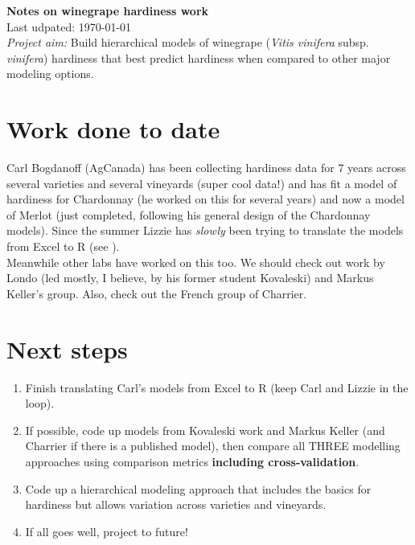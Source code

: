 \documentclass[11pt,letter]{article}
\begin{document}

\renewcommand{\refname}{\CHead{}}

{\bf Notes on winegrape hardiness work}\\

Last udpated: \today\\

\emph{Project aim:} Build hierarchical models of winegrape (\emph{Vitis vinifera} subsp. \emph{vinifera}) hardiness that best predict hardiness when compared to other major modeling options.

\section{Work done to date}
Carl Bogdanoff (AgCanada) has been collecting hardiness data for 7 years across several varieties and several vineyards (super cool data!) and has fit a model of hardiness for Chardonnay (he worked on this for several years) and now a model of Merlot (just completed, following his general design of the Chardonnay models). Since the summer Lizzie has \emph{slowly} been trying to translate the models from Excel to R (see ). \\

Meanwhile other labs have worked on this too. We should check out work by Londo (led mostly, I believe, by his former student Kovaleski) and Markus Keller's group. Also, check out the French group of Charrier. 

\section{Next steps}

\begin{enumerate}
\item Finish translating Carl's models from Excel to R (keep Carl and Lizzie in the loop).
\item If possible, code up models from Kovaleski work and Markus Keller (and Charrier if there is a published model), then compare all THREE modelling approaches using comparison metrics {\bf including cross-validation}.
\item Code up a hierarchical modeling approach that includes the basics for hardiness but allows variation across varieties and vineyards. 
\item If all goes well, project to future!
\end{enumerate}
\end{document}
